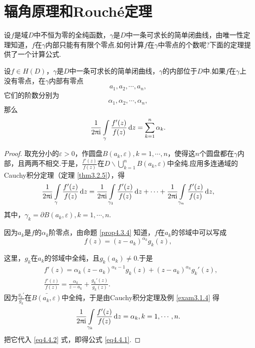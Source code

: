 \section{辐角原理和Rouch\'e定理\label{sec4.4}}
设$f$是域$D$中不恒为零的全纯函数，$\gamma$是$D$中一条可求长的简单闭曲线，由唯一性定理知道，$f$在$\gamma$内部只能有有限个零点.如何计算$f$在$\gamma$中零点的个数呢?下面的定理提供了一个计算公式.

\begin{theorem}\label{thm4.4.1}
  设$f\in H(D)$，$\gamma$是$D$中一条可求长的简单闭曲线，$\gamma$的内部位于$D$中.如果$f$在$\gamma$上没有零点，在$\gamma$内部有零点
  \[
    a_1, a_2, \cdots, a_n,
  \]
  它们的阶数分别为
  \[
    \alpha_1,\alpha_2,\cdots,\alpha_n,
  \]
  那么
  \begin{equation}\label{eq4.4.1}
    \frac1{2\uppi\mathrm i}\int\limits_{\gamma}\frac{f'(z)}{f(z)}\mathop{}\!\mathrm dz = \sum_{k=1}^n\alpha_k.
  \end{equation}
\end{theorem}
\begin{proof}
  取充分小的$\varepsilon>0$，作圆盘$B(a_k,\varepsilon),k=1,\cdots,n$，使得这$n$个圆盘都在$\gamma$内部，且两两不相交.于是，$\frac{f'(z)}{f(z)}$在$D\backslash
  \bigcup_{k=1}^nB(a_k,\varepsilon)$中全纯.应用多连通域的Cauchy积分定理（定理 \ref{thm3.2.5}），得
  \begin{equation}\label{eq4.4.2}
    \frac1{2\uppi\mathrm i}\int\limits_{\gamma}\frac{f'(z)}{f(z)}\mathop{}\!\mathrm dz
    = \frac1{2\uppi\mathrm i}\int\limits_{\gamma_1}\frac{f'(z)}{f(z)}\mathop{}\!\mathrm dz+\cdots+
    \frac1{2\uppi\mathrm i}\int\limits_{\gamma_n}\frac{f'(z)}{f(z)}\mathop{}\!\mathrm dz,
  \end{equation}
  其中，$\gamma_k=\partial B(a_k,\varepsilon),k=1,\cdots,n$.

  因为$a_k$是$f$的$\alpha_k$阶零点，由命题 \ref{prop4.3.4} 知道，$f$在$a_k$的邻域中可以写成
  \[
    f(z) = (z-a_k)^{\alpha_k}g_k(z),
  \]

  这里，$g_k$在$a_k$的邻域中全纯，且$g_k(a_k)\ne0$.于是
  \begin{align*}
    & f'(z) =\alpha_k(z-a_k)^{\alpha_k-1} g_k(z) + (z-a_k)^{\alpha_k}g_k'(z),\\
    & \frac{f'(z)}{f(z)} = \frac{\alpha_k}{z-a_k} + \frac{g_k'(z)}{g_k(z)}.
  \end{align*}
  因为$\frac{g_k'}{g_k}$在$\bar{B(a_k,\varepsilon)}$中全纯，于是由Cauchy积分定理及例 \ref{exam3.1.4} 得
  \[
    \frac1{2\uppi\mathrm i}\int\limits_{\gamma_k}\frac{f'(z)}{f(z)}\mathop{}\!\mathrm dz =\alpha_k,k=1,\cdots,n.
  \]
  把它代入 \eqref{eq4.4.2} 式，即得公式 \eqref{eq4.4.1}.
\end{proof}

